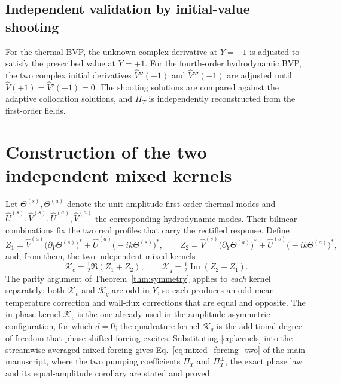 \documentclass[12pt,a4paper]{article}
\newcommand{\PiT}{\Pi_T}
\begin{document}
\subsection{Independent validation by initial-value shooting}
\label{app:validation}

For the thermal BVP, the unknown complex derivative at $Y=-1$ is adjusted to satisfy the prescribed
value at $Y=+1$. For the fourth-order hydrodynamic BVP, the two complex initial derivatives
$\widehat V''(-1)$ and $\widehat V'''(-1)$ are adjusted until $\widehat V(+1)=\widehat V'(+1)=0$.
The shooting solutions are compared against the adaptive collocation solutions, and $\PiT$ is independently
reconstructed from the first-order fields.

\section{Construction of the two independent mixed kernels}
\label{sec:kernels}

Let $\Theta^{(s)},\Theta^{(a)}$ denote the unit-amplitude first-order thermal modes and
$\widehat U^{(s)},\widehat V^{(s)},\widehat U^{(a)},\widehat V^{(a)}$ the corresponding
hydrodynamic modes. Their bilinear combinations fix the two real profiles that carry the
rectified response. Define
\begin{equation}
  Z_1=\widehat V^{(a)}\big(\partial_Y\Theta^{(s)}\big)^{*}
      +\widehat U^{(a)}\big(-ik\Theta^{(s)}\big)^{*},\qquad
  Z_2=\widehat V^{(s)}\big(\partial_Y\Theta^{(a)}\big)^{*}
      +\widehat U^{(s)}\big(-ik\Theta^{(a)}\big)^{*},
  \label{eq:Z_def}
\end{equation}
and, from them, the two independent mixed kernels
\begin{equation}
  \mathcal K_c=\tfrac12\Re(Z_1+Z_2),\qquad
  \mathcal K_q=\tfrac12\operatorname{Im}(Z_2-Z_1).
  \label{eq:kernels}
\end{equation}
The parity argument of Theorem~\ref{thm:symmetry} applies to \emph{each} kernel
separately: both $\mathcal K_c$ and $\mathcal K_q$ are odd in $Y$, so each produces an
odd mean temperature correction and wall-flux corrections that are equal and opposite.
The in-phase kernel $\mathcal K_c$ is the one already used in the amplitude-asymmetric
configuration, for which $d=0$; the quadrature kernel $\mathcal K_q$ is the additional
degree of freedom that phase-shifted forcing excites. Substituting
\eqref{eq:kernels} into the streamwise-averaged mixed forcing gives
Eq.~\eqref{eq:mixed_forcing_two} of the main manuscript, where the two pumping
coefficients $\PiT$ and $\PiT^{\perp}$, the exact phase law and its equal-amplitude
corollary are stated and proved.
\end{document}
